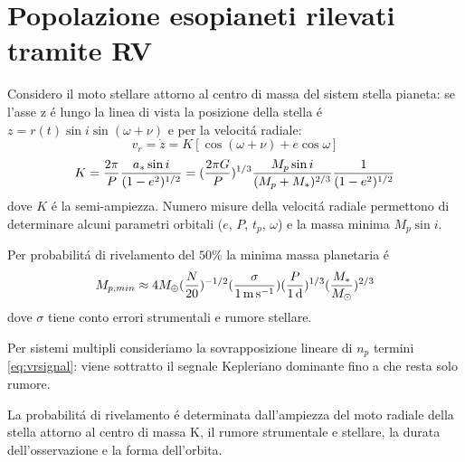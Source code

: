 \vspace{5cm}

\section{Popolazione esopianeti rilevati tramite RV}

Considero il moto stellare attorno al centro di massa del sistem stella pianeta:
se l'asse z \'e lungo la linea di vista la posizione della stella \'e $z=r(t)\sin{i}\sin{(\omega+\nu)}$ e per la velocit\'a radiale:
\begin{equation}
v_r=\dot{z}=K[\cos{(\omega+\nu)}+e\cos{\omega}]\label{eq:vrsignal}
\end{equation}
\begin{equation}
K=\frac{2\pi}{P}\frac{a_*\sin{i}}{(1-e^2)^{1/2}}=(\frac{2\pi G}{P})^{1/3}\frac{M_p\sin{i}}{(M_p+M_*)^{2/3}}\frac{1}{(1-e^2)^{1/2}}
\end{equation}
dove $K$ \'e la semi-ampiezza.
Numero misure della velocit\'a radiale permettono di determinare alcuni parametri orbitali ($e$, $P$, $t_p$, $\omega$) e la massa minima $M_p\sin{i}$.

\begin{errata}
Per probabilit\'a di rivelamento del $50\%$ la minima massa planetaria \'e
\begin{equation}
M_{p,min}\approx4\mearth{}(\frac{N}{20})\expy{-1/2}(\frac{\sigma}{\SI{1}{\meter\per\second}})(\frac{P}{\SI{1}{\day}})\expy{1/3}(\frac{M_*}{\msun{}})\expy{2/3}
\end{equation}
dove $\sigma$ tiene conto errori strumentali e rumore stellare.
\end{errata}
Per sistemi multipli consideriamo la sovrapposizione lineare di $n_p$ termini \eqref{eq:vrsignal}: viene sottratto il segnale Kepleriano dominante fino a che resta solo rumore.

La probabilit\'a di rivelamento \'e determinata dall'ampiezza del moto radiale della stella attorno al centro di massa K, il rumore strumentale e stellare, la durata dell'osservazione e la forma dell'orbita.


